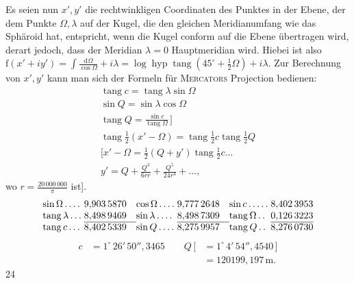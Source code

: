 Es seien nun \(x',y'\) die rechtwinkligen Coordinaten des Punktes in der Ebene, der dem Punkte \(\Omega,\lambda\) auf der Kugel, die den gleichen Meridianumfang wie das Sphäroid hat, entspricht, wenn die Kugel conform auf die Ebene übertragen wird, derart jedoch, dass der Meridian \(\lambda=0\) Hauptmeridian wird. Hiebei ist also \(\mathrm{f}(x'+iy')=\int\frac{\mathrm{d}\Omega}{\cos\Omega}+i\lambda=\log\operatorname{hyp}\operatorname{tang}(45^\circ+\frac12\Omega)+i\lambda\). Zur Berechnung von \(x',y'\) kann man sich der Formeln für \textsc{Mercators} Projection bedienen:
\[
\begin{gathered}
\operatorname{tang}c=\operatorname{tang}\lambda\sin\Omega\\
\sin Q=\sin\lambda\cos\Omega\\
\operatorname{tang}Q=\frac{\sin c}{\operatorname{tang}\Omega}\,]\\
\operatorname{tang}\tfrac12(x'-\Omega)=\operatorname{tang}\tfrac12c\operatorname{tang}\tfrac12Q\\
{[}x'-\Omega=\tfrac12(Q+y')\operatorname{tang}\tfrac12c\ldots\\
y'=Q+\frac{Q^3}{6rr}+\frac{Q^5}{24r^4}+\ldots,
\end{gathered}
\]
\noindent wo \(r=\frac{20\,000\,000}{\pi}\) ist].
\[
\begin{array}{@{}l@{\;}r@{\quad}l@{\;}r@{\quad}l@{\;}r@{}}
\sin\Omega\,.\,.\,.\,.&9{,}903\,5870&\cos\Omega\,.\,.\,.\,.&9{,}777\,2648&\sin c\,.\,.\,.\,.\,.&8{,}402\,3953\\
\operatorname{tang}\lambda\,.\,.\,.&8{,}498\,9469&\sin\lambda\,.\,.\,.\,.&8{,}498\,7309&\operatorname{tang}\Omega\,.\,.&0{,}126\,3223\\\cline{2-2}\cline{4-4}\cline{6-6}
\operatorname{tang}c\,.\,.\,.&8{,}402\,5339&\sin Q\,.\,.\,.\,.&8{,}275\,9957&\operatorname{tang}Q\,.\,.&8{,}276\,0730
\end{array}
\]
\[
\begin{aligned}
c&=1^\circ\,26'\,50''{,}3465\qquad
Q\,[&=1^\circ\,4'\,54''{,}4540\,]\\
&&=120199{,}197\,\mathrm{m}.
\end{aligned}
\]
\hfill{\small24}\hspace*{.12\linewidth}\par

